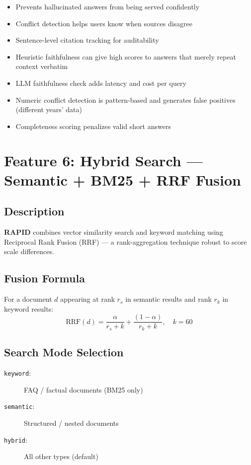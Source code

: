 \documentclass[12pt, a4paper, oneside]{report}
\newcommand{\kw}[1]{\texttt{\small #1}}
\newcommand{\rapidsys}{\textbf{\color{rapidblue}RAPID}}
\begin{document}
\begin{probox}[Benefits]
\begin{itemize}
  \item Prevents hallucinated answers from being served confidently
  \item Conflict detection helps users know when sources disagree
  \item Sentence-level citation tracking for auditability
\end{itemize}
\end{probox}

\begin{conbox}[Drawbacks]
\begin{itemize}
  \item Heuristic faithfulness can give high scores to answers that merely repeat context verbatim
  \item LLM faithfulness check adds latency and cost per query
  \item Numeric conflict detection is pattern-based and generates false positives (different years' data)
  \item Completeness scoring penalizes valid short answers
\end{itemize}
\end{conbox}

\section{Feature 6: Hybrid Search — Semantic + BM25 + RRF Fusion}

\subsection*{Description}
\rapidsys{} combines vector similarity search and keyword matching using Reciprocal Rank
Fusion (RRF) — a rank-aggregation technique robust to score scale differences.

\subsection*{Fusion Formula}
For a document $d$ appearing at rank $r_s$ in semantic results and rank $r_k$ in keyword results:
\[
  \text{RRF}(d) = \frac{\alpha}{r_s + k} + \frac{(1-\alpha)}{r_k + k}, \quad k = 60
\]

\subsection*{Search Mode Selection}
\begin{description}
  \item[\kw{keyword}:] FAQ / factual documents (BM25 only)
  \item[\kw{semantic}:] Structured / nested documents
  \item[\kw{hybrid}:] All other types (default)
\end{description}
\end{document}
